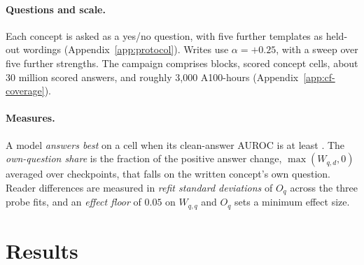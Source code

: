 \documentclass[11pt]{article}
\begin{document}
\paragraph{Questions and scale.}
Each concept is asked as a yes/no question, with five further templates as held-out wordings (Appendix~\ref{app:protocol}). Writes use $\alpha=+0.25$, with a sweep over five further strengths. The campaign comprises \cfBlocks{} blocks, \cfCells{} scored concept cells, about 30 million scored answers, and roughly 3{,}000 A100-hours (Appendix~\ref{app:cf-coverage}).

\paragraph{Measures.}
A model \emph{answers best} on a cell when its clean-answer AUROC is at least \cfStratTopEdge{}. The \emph{own-question share} is the fraction of the positive answer change, $\max(W_{q,d},0)$ averaged over checkpoints, that falls on the written concept's own question. Reader differences are measured in \emph{refit standard deviations} of $O_q$ across the three probe fits, and an \emph{effect floor} of $0.05$ on $W_{q,q}$ and $O_q$ sets a minimum effect size.

\section{Results}
\label{sec:results}
\end{document}
